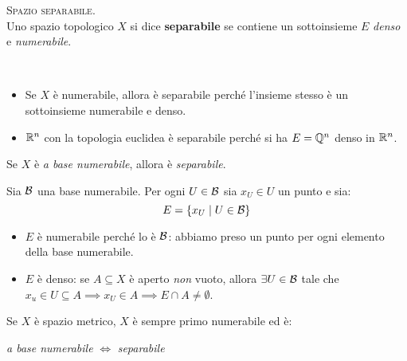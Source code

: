 \begin{define}\textsc{Spazio separabile.}\\
Uno spazio topologico $X$ si dice \textbf{separabile} se contiene un sottoinsieme $E$ \textit{denso} e \textit{numerabile}.
\end{define}
\begin{examples}~{}
	\begin{itemize}
		\item Se $X$ è numerabile, allora è separabile perché l'insieme stesso è un sottoinsieme numerabile e denso.
		\item $\mathbb{R}^n$ con la topologia euclidea è separabile perché si ha $E=\mathbb{Q}^n$ denso in $\mathbb{R}^n$.
	\end{itemize}
\vspace{-3mm}
\end{examples}
\begin{lemming}\label{basenumseparabile}
Se $X$ è \textit{a base numerabile}, allora è \textit{separabile}.
\end{lemming}
\begin{demonstration}
	Sia $\mathcal{B}$ una base numerabile. Per ogni $U\in\mathcal{B}$ sia $x_U\in U$ un punto e sia:
	\begin{equation*}
		E=\left\{x_U\mid U\in \mathcal{B}\right\}
	\end{equation*}
\begin{itemize}
	\item $E$ è numerabile perché lo è $\mathcal{B}$: abbiamo preso un punto per ogni elemento della base numerabile.
	\item $E$ è denso: se $A\subseteq X$ è aperto \textit{non} vuoto, allora $\exists U\in\mathcal{B}$ tale che $x_u\in U\subseteq A\implies x_U\in A\implies E\cap A\neq \emptyset$.
\end{itemize}
\vspace{-3mm}
\end{demonstration}
\begin{proposition}
	Se $X$ è spazio metrico, $X$ è sempre primo numerabile ed è:
	\begin{center}
		\textit{a base numerabile} $\iff$ \textit{separabile}
	\end{center}
\vspace{-6mm}
\end{proposition}
